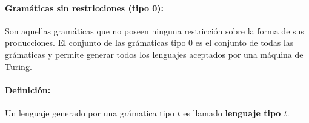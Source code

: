 \paragraph{Gramáticas sin restricciones (tipo 0):} Son aquellas gramáticas que no poseen ninguna restricción sobre la forma de sus producciones. El conjunto de las grámaticas tipo 0 es el conjunto de todas las grámaticas y permite generar todos los lenguajes aceptados por una máquina de Turing.

\paragraph{Definición:} Un lenguaje generado por una grámatica tipo \(t\) es llamado \textbf{lenguaje tipo \(t\)}.
